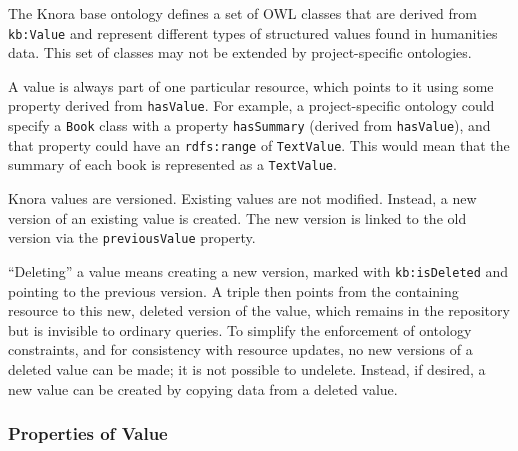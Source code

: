 \documentclass[12pt, a4paper]{article}
\begin{document}
\label{subsec:values}

The Knora base ontology defines a set of OWL classes that are derived from \texttt{kb:Value} and represent different types of structured values found in humanities data. This set of classes may not be extended by project-specific ontologies.

A value is always part of one particular resource, which points to it using some property derived from \texttt{hasValue}. For example, a project-specific ontology could specify a \texttt{Book} class with a property \texttt{hasSummary} (derived from \texttt{hasValue}), and that property could have an \texttt{rdfs:range} of \texttt{TextValue}. This would mean that the summary of each book is represented as a \texttt{TextValue}.

Knora values are versioned. Existing values are not modified. Instead, a new version of an existing value is created. The new version is linked to the old version via the \texttt{previousValue} property.

\enquote{Deleting} a value means creating a new version, marked with \texttt{kb:isDeleted} and pointing to the previous version. A triple then points from the containing resource to this new, deleted version of the value, which remains in the repository but is invisible to ordinary queries. To simplify the enforcement of ontology constraints, and for consistency with resource updates, no new versions of a deleted value can be made; it is not possible to undelete. Instead, if desired, a new value can be created by copying data from a deleted value.

\subsubsection{Properties of Value}
\end{document}
